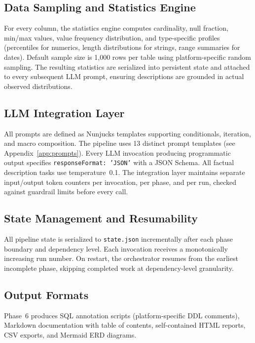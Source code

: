 \documentclass[sigconf, nonacm]{acmart}
\begin{document}
\subsection{Data Sampling and Statistics Engine}

For every column, the statistics engine computes cardinality, null fraction, min/max values, value frequency distribution, and type-specific profiles (percentiles for numerics, length distributions for strings, range summaries for dates). Default sample size is 1,000 rows per table using platform-specific random sampling. The resulting statistics are serialized into persistent state and attached to every subsequent LLM prompt, ensuring descriptions are grounded in actual observed distributions.

\subsection{LLM Integration Layer}

All prompts are defined as Nunjucks templates supporting conditionals, iteration, and macro composition. The pipeline uses 13 distinct prompt templates (see Appendix~\ref{app:prompts}). Every LLM invocation producing programmatic output specifies \texttt{responseFormat:~'JSON'} with a JSON Schema. All factual description tasks use temperature~0.1. The integration layer maintains separate input/output token counters per invocation, per phase, and per run, checked against guardrail limits before every call.

\subsection{State Management and Resumability}

All pipeline state is serialized to \texttt{state.json} incrementally after each phase boundary and dependency level. Each invocation receives a monotonically increasing run number. On restart, the orchestrator resumes from the earliest incomplete phase, skipping completed work at dependency-level granularity.

\subsection{Output Formats}

Phase~6 produces SQL annotation scripts (platform-specific DDL comments), Markdown documentation with table of contents, self-contained HTML reports, CSV exports, and Mermaid ERD diagrams.
\end{document}
